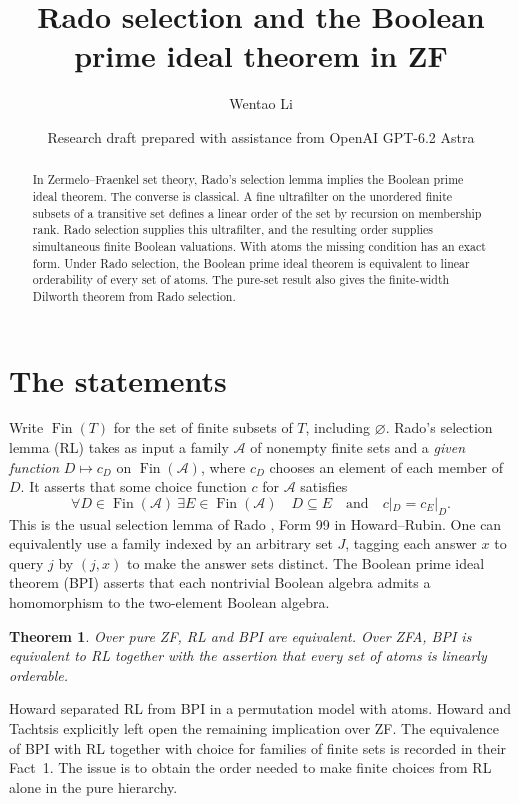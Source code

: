 \documentclass[11pt]{article}
\title{Rado selection and the Boolean prime ideal theorem in ZF}
\author{Wentao Li}
\date{Research draft prepared with assistance from OpenAI GPT-6.2 Astra}
\newtheorem{theorem}{Theorem}
\newcommand{\Fin}{\operatorname{Fin}}
\begin{document}
\maketitle
\begin{abstract}
In Zermelo--Fraenkel set theory, Rado's selection lemma implies the Boolean prime ideal theorem. The converse is classical. A fine ultrafilter on the unordered finite subsets of a transitive set defines a linear order of the set by recursion on membership rank. Rado selection supplies this ultrafilter, and the resulting order supplies simultaneous finite Boolean valuations. With atoms the missing condition has an exact form. Under Rado selection, the Boolean prime ideal theorem is equivalent to linear orderability of every set of atoms. The pure-set result also gives the finite-width Dilworth theorem from Rado selection.
\end{abstract}

\section{The statements}
Write $\Fin(T)$ for the set of finite subsets of $T$, including $\varnothing$.
Rado's selection lemma (RL) takes as input a family $\mathcal A$ of nonempty finite sets and a \emph{given function} $D\mapsto c_D$ on $\Fin(\mathcal A)$, where $c_D$ chooses an element of each member of $D$. It asserts that some choice function $c$ for $\mathcal A$ satisfies
\[
 \forall D\in\Fin(\mathcal A)\ \exists E\in\Fin(\mathcal A)
 \quad D\subseteq E\quad\text{and}\quad c|_D=c_E|_D .
\]
This is the usual selection lemma of Rado \cite{rado}, Form 99 in Howard--Rubin. One can equivalently use a family indexed by an arbitrary set $J$, tagging each answer $x$ to query $j$ by $(j,x)$ to make the answer sets distinct. The Boolean prime ideal theorem (BPI) asserts that each nontrivial Boolean algebra admits a homomorphism to the two-element Boolean algebra.

\begin{theorem}\label{main}
Over pure ZF, RL and BPI are equivalent. Over ZFA, BPI is equivalent to RL together with the assertion that every set of atoms is linearly orderable.
\end{theorem}
Howard \cite{how84,how93} separated RL from BPI in a permutation model with atoms. Howard and Tachtsis \cite[Section~1]{ht} explicitly left open the remaining implication over ZF. The equivalence of BPI with RL together with choice for families of finite sets is recorded in their Fact~1. The issue is to obtain the order needed to make finite choices from RL alone in the pure hierarchy.
\end{document}
